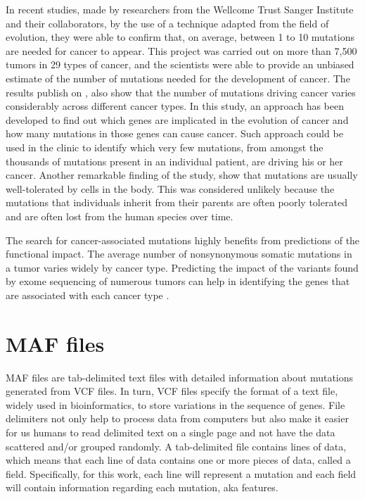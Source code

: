 In recent studies, made by researchers from the Wellcome Trust Sanger Institute and their collaborators, by the use of a technique adapted from the field of evolution, they were able to confirm that, on average, between 1 to 10 mutations are needed for cancer to appear. This project was carried out on more than 7,500 tumors in 29 types of cancer, and the scientists were able to provide an unbiased estimate of the number of mutations needed for the development of cancer. The results publish on \cite{Iñigo}, also show that the number of mutations driving cancer varies considerably across different cancer types. In this study, an approach has been developed to find out which genes are implicated in the evolution of cancer and how many mutations in those genes can cause cancer. Such approach could be used in the clinic to identify which very few mutations, from amongst the thousands of mutations present in an individual patient, are driving his or her cancer. Another remarkable finding of the study, show that mutations are usually well-tolerated by cells in the body. This was considered unlikely because the mutations that individuals inherit from their parents are often poorly tolerated and are often lost from the human species over time.

The search for cancer-associated mutations highly benefits from predictions of the functional impact. The average number of nonsynonymous somatic mutations in a tumor varies widely by cancer type. Predicting the impact of the variants found by exome sequencing of numerous tumors can help in identifying the genes that are associated with each cancer type \cite{Katsonis}.



\section{MAF files} %
\label{sec:maf_format}
\hspace{10px} MAF files are tab-delimited text files with detailed information about mutations generated from VCF files. In turn, VCF files specify the format of a text file, widely used in bioinformatics, to store variations in the sequence of genes. File delimiters not only help to process data from computers but also make it easier for us humans to read delimited text on a single page and not have the data scattered and/or grouped randomly. A tab-delimited file contains lines of data, which means that each line of data contains one or more pieces of data, called a field. Specifically, for this work, each line will represent a mutation and each field will contain information regarding each mutation, aka features.


